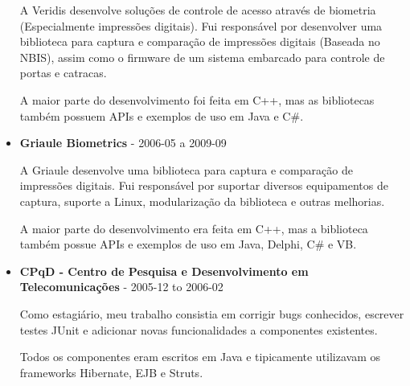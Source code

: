 \documentclass[a4paper,10pt]{article}
\begin{document}
\begin{itemize}
        A Veridis desenvolve soluções de controle de acesso através de biometria (Especialmente impressões digitais). Fui responsável por desenvolver uma biblioteca para captura e comparação de impressões digitais (Baseada no NBIS), assim como o firmware de um sistema embarcado para controle de portas e catracas.
        
        A maior parte do desenvolvimento foi feita em C++, mas as bibliotecas também possuem APIs e exemplos de uso em Java e C\#.

      \item
        \textbf{Griaule Biometrics} - 2006-05 a 2009-09
        
        A Griaule desenvolve uma biblioteca para captura e comparação de impressões digitais. Fui responsável por suportar diversos equipamentos de captura, suporte a Linux, modularização da biblioteca e outras melhorias.
        
        A maior parte do desenvolvimento era feita em C++, mas a biblioteca também possue APIs e exemplos de uso em Java, Delphi, C\# e VB.

      \item
        \textbf{CPqD - Centro de Pesquisa e Desenvolvimento em Telecomunicações} - 2005-12 to 2006-02

        Como estagiário, meu trabalho consistia em corrigir bugs conhecidos, escrever testes JUnit e adicionar novas funcionalidades a componentes existentes.

        Todos os componentes eram escritos em Java e tipicamente utilizavam os frameworks Hibernate, EJB e Struts.
    \end{itemize}
\end{document}

